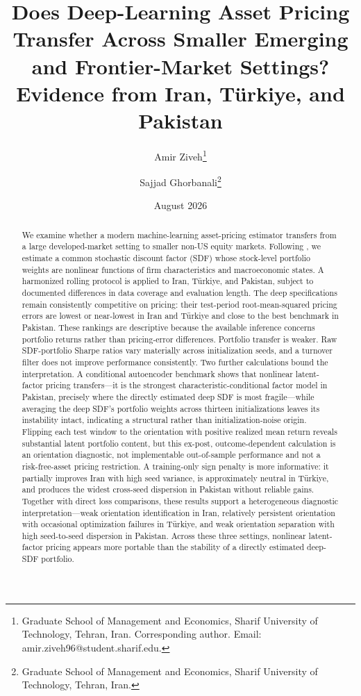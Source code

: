 \documentclass[12pt]{article}
\title{\bfseries Does Deep-Learning Asset Pricing Transfer Across Smaller Emerging and Frontier-Market Settings?\\
Evidence from Iran, T\"urkiye, and Pakistan}
\author{Amir Ziveh\thanks{Graduate School of Management and Economics, Sharif University of Technology, Tehran, Iran. Corresponding author. Email: amir.ziveh96@student.sharif.edu.} \and Sajjad Ghorbanali\thanks{Graduate School of Management and Economics, Sharif University of Technology, Tehran, Iran.}}
\date{August 2026}
\begin{document}
\maketitle

\begin{abstract}
\noindent We examine whether a modern machine-learning asset-pricing estimator transfers from a large developed-market setting to smaller non-US equity markets. Following \citet{cpz2024}, we estimate a common stochastic discount factor (SDF) whose stock-level portfolio weights are nonlinear functions of firm characteristics and macroeconomic states. A harmonized rolling protocol is applied to Iran, T\"urkiye, and Pakistan, subject to documented differences in data coverage and evaluation length. The deep specifications remain consistently competitive on pricing: their test-period root-mean-squared pricing errors are lowest or near-lowest in Iran and T\"urkiye and close to the best benchmark in Pakistan. These rankings are descriptive because the available inference concerns portfolio returns rather than pricing-error differences. Portfolio transfer is weaker. Raw SDF-portfolio Sharpe ratios vary materially across initialization seeds, and a turnover filter does not improve performance consistently. Two further calculations bound the interpretation. A conditional autoencoder benchmark \citep{gkx2021} shows that nonlinear latent-factor pricing transfers---it is the strongest characteristic-conditional factor model in Pakistan, precisely where the directly estimated deep SDF is most fragile---while averaging the deep SDF's portfolio weights across thirteen initializations leaves its instability intact, indicating a structural rather than initialization-noise origin. Flipping each test window to the orientation with positive realized mean return reveals substantial latent portfolio content, but this ex-post, outcome-dependent calculation is an orientation diagnostic, not implementable out-of-sample performance and not a risk-free-asset pricing restriction. A training-only sign penalty is more informative: it partially improves Iran with high seed variance, is approximately neutral in T\"urkiye, and produces the widest cross-seed dispersion in Pakistan without reliable gains. Together with direct loss comparisons, these results support a heterogeneous diagnostic interpretation---weak orientation identification in Iran, relatively persistent orientation with occasional optimization failures in T\"urkiye, and weak orientation separation with high seed-to-seed dispersion in Pakistan. Across these three settings, nonlinear latent-factor pricing appears more portable than the stability of a directly estimated deep-SDF portfolio.
\end{abstract}
\end{document}
